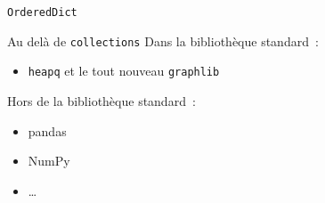 \begin{frame}{\texttt{OrderedDict}}
\end{frame}

\begin{frame}{Au delà de \texttt{collections}}
  Dans la bibliothèque standard~:
  \begin{itemize}[<+->]
    \item \texttt{heapq} et le tout nouveau \texttt{graphlib}
  \end{itemize}
  Hors de la bibliothèque standard~:
  \begin{itemize}[<+->]
    \item pandas
    \item NumPy
    \item …
  \end{itemize}
\end{frame}
